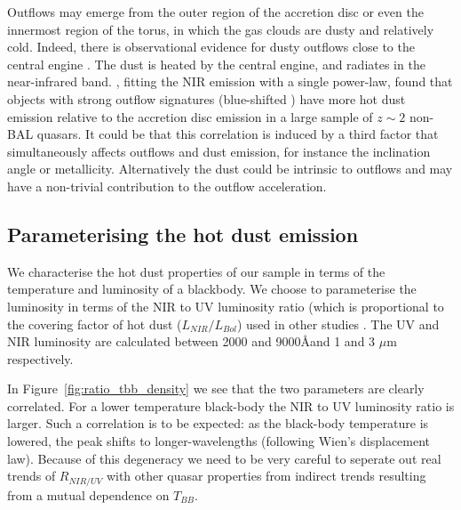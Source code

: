 Outflows may emerge from the outer region of the accretion disc or even the innermost region of the torus, in which the gas clouds are dusty and relatively cold.  
Indeed, there is observational evidence for dusty outflows close to the central engine \citep[e.g.][]{bowler14}.
The dust is heated by the central engine, and radiates in the near-infrared band. 
\citet{wang13}, fitting the NIR emission with a single power-law, found that objects with strong outflow signatures (blue-shifted ) have more hot dust emission relative to the accretion disc emission in a large sample of $z\sim2$ non-BAL quasars. 
It could be that this correlation is induced by a third factor that simultaneously affects outflows and dust emission, for instance the inclination angle or metallicity. 
Alternatively the dust could be intrinsic to outflows and may have a non-trivial contribution to the outflow acceleration.

\subsection{Parameterising the hot dust emission}

We characterise the hot dust properties of our sample in terms of the temperature and luminosity of a blackbody.  
We choose to parameterise the luminosity in terms of the NIR to UV luminosity ratio (which is proportional to the covering factor of hot dust ($L_{NIR}/L_{Bol}$) used in other studies \citep{roseboom13}. 
The UV and NIR luminosity are calculated between 2000 and 9000\AA and 1 and 3 $\mu$m respectively.

In Figure~\ref{fig:ratio_tbb_density} we see that the two parameters are clearly correlated. 
For a lower temperature black-body the NIR to UV luminosity ratio is larger. 
Such a correlation is to be expected: as the black-body temperature is lowered, the peak shifts to longer-wavelengths (following Wien's displacement law). 
Because of this degeneracy we need to be very careful to seperate out real trends of $R_{NIR/UV}$ with other quasar properties from indirect trends resulting from a mutual dependence on $T_{BB}$.  

